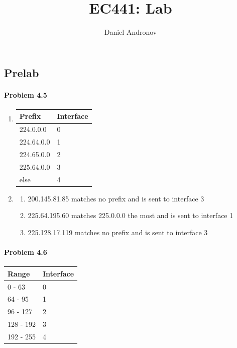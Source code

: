 \documentclass[12pt]{article}
\title{EC441: Lab \hwNum{}}
\author{Daniel Andronov}
\date{\displaydate{date}}
\begin{document}
\maketitle
\newpage

\subsection{Prelab}
\paragraph{Problem 4.5 }
\begin{enumerate}[label=\textbf{Part \alph*)},leftmargin=*,align=left]
	\item\begin{tabular}{ | l | l | }
			\hline
			Prefix & Interface \\ \hline 
			224.0.0.0 & 0 \\ \hline 
			224.64.0.0 & 1 \\ \hline 
			224.65.0.0 & 2 \\ \hline 
			225.64.0.0 & 3 \\ \hline 
			else & 4 \\ \hline
		\end{tabular}
	\item  \begin{enumerate}[label=\textbf{i)}]
		\item 200.145.81.85 matches no prefix and is sent to interface 3
		\item 225.64.195.60 matches 225.0.0.0 the most and is sent to interface 1
		\item 225.128.17.119 matches no prefix and is sent to interface 3
		\end{enumerate}			
\end{enumerate}

\paragraph{Problem 4.6 }
\begin{tabular}{ | l | l | }
	\hline
	Range & Interface \\ \hline
	0 - 63 & 0 \\ \hline
	64 - 95 & 1 \\ \hline
	96 - 127 & 2 \\ \hline
	128 - 192 & 3 \\ \hline
	192 - 255 & 4 \\ \hline
\end{tabular}
\end{document}
